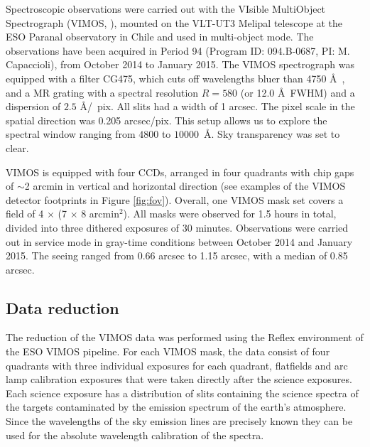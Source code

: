 \documentclass[useAMS,usenatbib]{mn2e}
\begin{document}
Spectroscopic observations were carried out with the VIsible MultiObject 
Spectrograph (VIMOS, \citealt{LeFevre}), mounted on the VLT-UT3 Melipal 
telescope at the ESO Paranal observatory in Chile and used in multi-object 
mode. The observations have been acquired in Period 94 (Program ID: 094.B-0687, 
PI: M. Capaccioli), from October 2014 to January 2015. 
The VIMOS spectrograph was equipped with a filter CG475, which cuts off 
wavelengths bluer than 4750 \AA\ , and a MR grating with a spectral resolution 
$R = 580$ (or 12.0 \AA\ FWHM) 
and a dispersion of $2.5$ \AA /~pix. All slits had a width of 1 arcsec. The 
pixel scale in the spatial direction was 0.205 arcsec/pix. This setup allows us 
to explore the spectral window ranging from $4800$ to $10000$~\AA. Sky 
transparency was set to clear.

VIMOS is equipped with four CCDs, arranged in four quadrants with chip gaps of 
$\sim$2 arcmin in vertical and horizontal direction (see examples of the VIMOS 
detector footprints in Figure \ref{fig:fov}). Overall, one VIMOS mask set 
covers a field of 4 $\times$ (7 $\times$ 8 arcmin$^2$). All masks were observed 
for 1.5 hours in total, divided into three dithered exposures of 30 minutes. 
Observations were carried out in service mode in gray-time conditions between 
October 2014 and January 2015. The seeing ranged from 0.66 arcsec to 1.15 
arcsec, with a median of 0.85 arcsec. 

\subsection{Data reduction}

The reduction of the VIMOS data was performed using the Reflex 
environment \citep{Freudling13} of the ESO VIMOS pipeline. 
For each VIMOS mask, the data consist of four 
quadrants with three individual exposures for each quadrant, flatfields and
arc lamp calibration exposures that were taken directly after the science 
exposures. Each science exposure has a distribution of slits containing the 
science spectra of the targets contaminated by the emission spectrum of the 
earth's atmosphere. Since the wavelengths of the sky emission lines are 
precisely known they can be used for the absolute wavelength calibration of 
the spectra.
\end{document}
